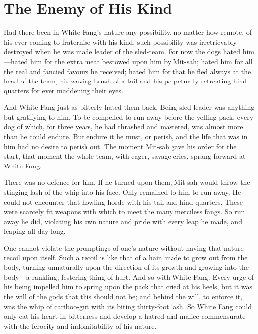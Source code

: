 \documentclass[10pt]{book}
\begin{document}
\chapter{The Enemy of His Kind}

Had there been in White Fang’s nature any possibility, no matter how
remote, of his ever coming to fraternise with his kind, such
possibility was irretrievably destroyed when he was made leader of the
sled-team. For now the dogs hated him—hated him for the extra meat
bestowed upon him by Mit-sah; hated him for all the real and fancied
favours he received; hated him for that he fled always at the head of
the team, his waving brush of a tail and his perpetually retreating
hind-quarters for ever maddening their eyes.

And White Fang just as bitterly hated them back. Being sled-leader was
anything but gratifying to him. To be compelled to run away before the
yelling pack, every dog of which, for three years, he had thrashed and
mastered, was almost more than he could endure. But endure it he must,
or perish, and the life that was in him had no desire to perish out.
The moment Mit-sah gave his order for the start, that moment the whole
team, with eager, savage cries, sprang forward at White Fang.

There was no defence for him. If he turned upon them, Mit-sah would
throw the stinging lash of the whip into his face. Only remained to him
to run away. He could not encounter that howling horde with his tail
and hind-quarters. These were scarcely fit weapons with which to meet
the many merciless fangs. So run away he did, violating his own nature
and pride with every leap he made, and leaping all day long.

One cannot violate the promptings of one’s nature without having that
nature recoil upon itself. Such a recoil is like that of a hair, made
to grow out from the body, turning unnaturally upon the direction of
its growth and growing into the body—a rankling, festering thing of
hurt. And so with White Fang. Every urge of his being impelled him to
spring upon the pack that cried at his heels, but it was the will of
the gods that this should not be; and behind the will, to enforce it,
was the whip of cariboo-gut with its biting thirty-foot lash. So White
Fang could only eat his heart in bitterness and develop a hatred and
malice commensurate with the ferocity and indomitability of his nature.
\end{document}
